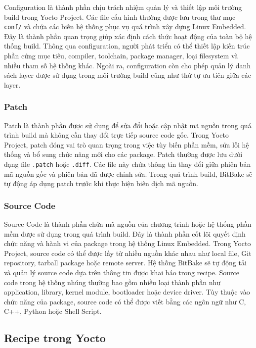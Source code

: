 Configuration là thành phần chịu trách nhiệm quản lý và thiết lập môi trường build trong Yocto Project. Các file cấu hình thường được lưu trong thư mục \texttt{conf/} và chứa các biến hệ thống phục vụ quá trình xây dựng Linux Embedded. Đây là thành phần quan trọng giúp xác định cách thức hoạt động của toàn bộ hệ thống build. Thông qua configuration, người phát triển có thể thiết lập kiến trúc phần cứng mục tiêu, compiler, toolchain, package manager, loại filesystem và nhiều tham số hệ thống khác. Ngoài ra, configuration còn cho phép quản lý danh sách layer được sử dụng trong môi trường build cũng như thứ tự ưu tiên giữa các layer.

\subsubsection{Patch}

Patch là thành phần được sử dụng để sửa đổi hoặc cập nhật mã nguồn trong quá trình build mà không cần thay đổi trực tiếp source code gốc. Trong Yocto Project, patch đóng vai trò quan trọng trong việc tùy biến phần mềm, sửa lỗi hệ thống và bổ sung chức năng mới cho các package. Patch thường được lưu dưới dạng file \texttt{.patch} hoặc \texttt{.diff}. Các file này chứa thông tin thay đổi giữa phiên bản mã nguồn gốc và phiên bản đã được chỉnh sửa. Trong quá trình build, BitBake sẽ tự động áp dụng patch trước khi thực hiện biên dịch mã nguồn.

\subsubsection{Source Code}

Source Code là thành phần chứa mã nguồn của chương trình hoặc hệ thống phần mềm được sử dụng trong quá trình build. Đây là thành phần cốt lõi quyết định chức năng và hành vi của package trong hệ thống Linux Embedded. Trong Yocto Project, source code có thể được lấy từ nhiều nguồn khác nhau như local file, Git repository, tarball package hoặc remote server. Hệ thống BitBake sẽ tự động tải và quản lý source code dựa trên thông tin được khai báo trong recipe. Source code trong hệ thống nhúng thường bao gồm nhiều loại thành phần như application, library, kernel module, bootloader hoặc device driver. Tùy thuộc vào chức năng của package, source code có thể được viết bằng các ngôn ngữ như C, C++, Python hoặc Shell Script.

\subsection{Recipe trong Yocto}

